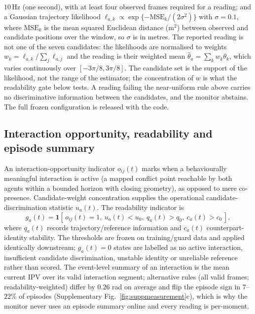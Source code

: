\documentclass[12pt,a4paper]{article}
\begin{document}
$10$\,Hz (one second), with at least four observed frames required for a reading; and a Gaussian
trajectory likelihood $\ell_{a,k}\propto\exp\{-\mathrm{MSE}_k/(2\sigma^2)\}$ with $\sigma=0.1$,
where $\mathrm{MSE}_k$ is the mean squared Euclidean distance (m$^2$) between observed and candidate
positions over the window, so $\sigma$ is in metres. The reported reading is not one of the seven
candidates: the likelihoods are normalised to weights $w_k=\ell_{a,k}/\sum_j\ell_{a,j}$ and the
reading is their weighted mean $\hat\theta_a=\sum_k w_k\theta_k$, which varies continuously over
$[-3\pi/8,3\pi/8]$. The candidate set is the support of the likelihood, not the range of the
estimator; the concentration of $w$ is what the readability gate below tests. A reading failing the near-uniform rule above carries no discriminative information between
the candidates, and the monitor abstains. The full frozen configuration is released with the code.

\subsection{Interaction opportunity, readability and episode summary}
An interaction-opportunity indicator $o_{ij}(t)$ marks when a behaviourally meaningful interaction is
active (a mapped conflict point reachable by both agents within a bounded horizon with closing
geometry), as opposed to mere co-presence. Candidate-weight concentration supplies the operational
candidate-discrimination statistic $u_a(t)$. The readability indicator is
\begin{equation}
  g_a(t) = \mathbf{1}\!\left[\,o_{ij}(t)=1,\ u_a(t)<u_0,\ q_a(t)>q_0,\ c_a(t)>c_0\,\right],
  \label{eq:readability}
\end{equation}
where $q_a(t)$ records trajectory/reference information and $c_a(t)$ counterpart-identity stability.
The thresholds are frozen on training/guard data and applied identically downstream; $g_a(t)=0$
states are labelled as no active interaction, insufficient candidate discrimination, unstable
identity or unreliable reference rather than scored.
The event-level summary of an interaction
is the mean current IPV over its valid interaction segment; alternative rules (all valid frames;
readability-weighted) differ by $0.26$ rad on average and flip the episode sign in $7$--$22\%$ of
episodes (Supplementary Fig.~\ref{fig:suppmeasurement}c), which is why the monitor never uses an episode summary
online and every reading is per-moment.
\end{document}
